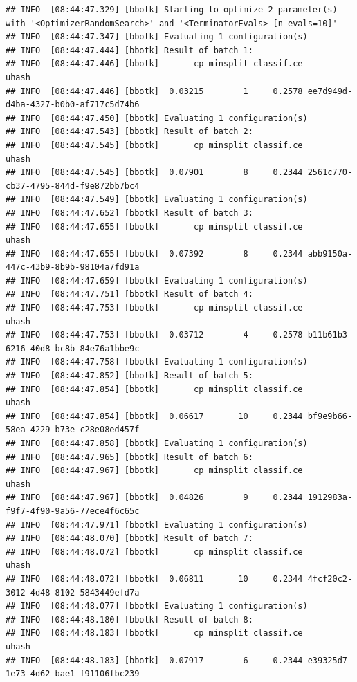\documentclass[
]{scrbook}
\begin{document}
\begin{verbatim}
## INFO  [08:44:47.329] [bbotk] Starting to optimize 2 parameter(s) with '<OptimizerRandomSearch>' and '<TerminatorEvals> [n_evals=10]' 
## INFO  [08:44:47.347] [bbotk] Evaluating 1 configuration(s) 
## INFO  [08:44:47.444] [bbotk] Result of batch 1: 
## INFO  [08:44:47.446] [bbotk]       cp minsplit classif.ce                                uhash 
## INFO  [08:44:47.446] [bbotk]  0.03215        1     0.2578 ee7d949d-d4ba-4327-b0b0-af717c5d74b6 
## INFO  [08:44:47.450] [bbotk] Evaluating 1 configuration(s) 
## INFO  [08:44:47.543] [bbotk] Result of batch 2: 
## INFO  [08:44:47.545] [bbotk]       cp minsplit classif.ce                                uhash 
## INFO  [08:44:47.545] [bbotk]  0.07901        8     0.2344 2561c770-cb37-4795-844d-f9e872bb7bc4 
## INFO  [08:44:47.549] [bbotk] Evaluating 1 configuration(s) 
## INFO  [08:44:47.652] [bbotk] Result of batch 3: 
## INFO  [08:44:47.655] [bbotk]       cp minsplit classif.ce                                uhash 
## INFO  [08:44:47.655] [bbotk]  0.07392        8     0.2344 abb9150a-447c-43b9-8b9b-98104a7fd91a 
## INFO  [08:44:47.659] [bbotk] Evaluating 1 configuration(s) 
## INFO  [08:44:47.751] [bbotk] Result of batch 4: 
## INFO  [08:44:47.753] [bbotk]       cp minsplit classif.ce                                uhash 
## INFO  [08:44:47.753] [bbotk]  0.03712        4     0.2578 b11b61b3-6216-40d8-bc8b-84e76a1bbe9c 
## INFO  [08:44:47.758] [bbotk] Evaluating 1 configuration(s) 
## INFO  [08:44:47.852] [bbotk] Result of batch 5: 
## INFO  [08:44:47.854] [bbotk]       cp minsplit classif.ce                                uhash 
## INFO  [08:44:47.854] [bbotk]  0.06617       10     0.2344 bf9e9b66-58ea-4229-b73e-c28e08ed457f 
## INFO  [08:44:47.858] [bbotk] Evaluating 1 configuration(s) 
## INFO  [08:44:47.965] [bbotk] Result of batch 6: 
## INFO  [08:44:47.967] [bbotk]       cp minsplit classif.ce                                uhash 
## INFO  [08:44:47.967] [bbotk]  0.04826        9     0.2344 1912983a-f9f7-4f90-9a56-77ece4f6c65c 
## INFO  [08:44:47.971] [bbotk] Evaluating 1 configuration(s) 
## INFO  [08:44:48.070] [bbotk] Result of batch 7: 
## INFO  [08:44:48.072] [bbotk]       cp minsplit classif.ce                                uhash 
## INFO  [08:44:48.072] [bbotk]  0.06811       10     0.2344 4fcf20c2-3012-4d48-8102-5843449efd7a 
## INFO  [08:44:48.077] [bbotk] Evaluating 1 configuration(s) 
## INFO  [08:44:48.180] [bbotk] Result of batch 8: 
## INFO  [08:44:48.183] [bbotk]       cp minsplit classif.ce                                uhash 
## INFO  [08:44:48.183] [bbotk]  0.07917        6     0.2344 e39325d7-1e73-4d62-bae1-f91106fbc239 

\end{verbatim}
\end{document}
